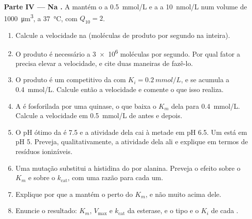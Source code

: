 \begin{problem}
\medskip
\noindent\textbf{Parte IV --- Na .}
A  mantém o  a \qty{0.5}{mmol/L} e a  a
\qty{10}{nmol/L} num volume de \qty{1000}{\micro m^3}, a
\qty{37}{\celsius}, com $Q_{10} = 2$.
\begin{enumerate}[resume]
  \item Calcule a velocidade na  (moléculas de produto por segundo
        na  inteira).
  \item O produto é necessário a \qty{3e6}{} moléculas por segundo. Por
        qual fator a  precisa elevar a velocidade, e cite duas
        maneiras de fazê-lo.
  \item O produto é um  competitivo da  com
        $K_i = \qty{0.2}{mmol/L}$, e se acumula a \qty{0.4}{mmol/L}.
        Calcule então a velocidade e comente o que isso realiza.
  \item A  é fosforilada por uma quinase, o que baixa o $K_m$ dela
        para \qty{0.4}{mmol/L}. Calcule a velocidade em
        \qty{0.5}{mmol/L} de  antes e depois.
  \item O pH ótimo da  é 7.5 e a atividade dela cai à metade em pH
        6.5. Um  está em pH 5. Preveja, qualitativamente, a
        atividade dela ali e explique em termos de resíduos ionizáveis.
  \item Uma mutação substitui a histidina do  por alanina.
        Preveja o efeito sobre o $K_m$ e sobre o $k_{\text{cat}}$, com
        uma razão para cada um.
  \item Explique por que a  mantém o  perto do $K_m$, e
        não muito acima dele.
  \item Enuncie o resultado: $K_m$, $V_{\max}$ e $k_{\text{cat}}$ da
        esterase, e o tipo e o $K_i$ de cada .
\end{enumerate}
\end{problem}
